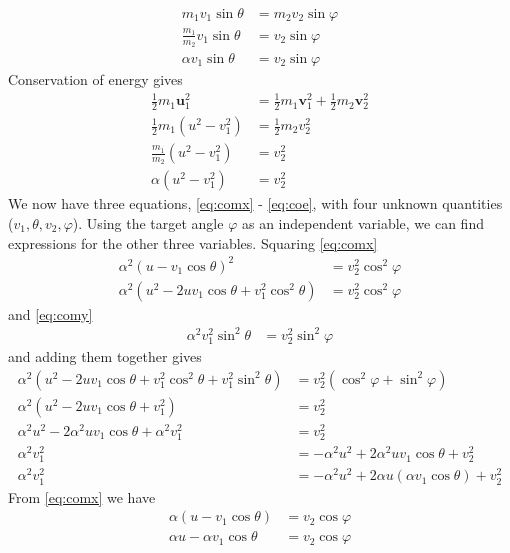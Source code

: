 \documentclass[twoside,english]{uiofysmaster/uiofysmaster}
\let\orgautoref\autoref
\renewcommand{\autoref}
        {%
		 \def\sectionautorefname{Section}%
		 \def\subsectionautorefname{Section}%
		 \def\subsubsectionautorefname{Section}%
		 \def\chapterautorefname{Chapter}%
          \orgautoref}
\begin{document}
\begin{appendices}
\begin{align}
	m_1 v_1 \sin \theta &= m_2 v_2 \sin \varphi \nonumber\\
	\frac{m_1}{m_2} v_1 \sin \theta &= v_2 \sin \varphi \nonumber\\
	\alpha v_1 \sin \theta &= v_2 \sin \varphi
\end{align}
Conservation of energy gives
\begin{align}\label{eq:coe}
	\tfrac{1}{2} m_1 \boldsymbol{u}_1^2 &= \tfrac{1}{2} m_1 \boldsymbol{v}_1^2 + \tfrac{1}{2} m_2 \boldsymbol{v}_2^2 \nonumber\\
	\tfrac{1}{2} m_1 (u^2 - v_1^2) &= \tfrac{1}{2} m_2 v_2^2 \nonumber\\
	\frac{m_1}{m_2} (u^2 - v_1^2) &= v_2^2 \nonumber\\
	\alpha (u^2 - v_1^2) &= v_2^2
\end{align}
We now have three equations, \autoref{eq:comx} - \autoref{eq:coe}, with four unknown quantities ($v_1, \theta, v_2, \varphi$). 
Using the target angle $\varphi$ as an independent variable, we can find expressions for the other three variables. 
Squaring \autoref{eq:comx} 
\begin{align*}%
	\alpha^2 (u - v_1 \cos \theta)^2 &= v_2^2 \cos^2 \varphi  \\
	\alpha^2 (u^2 - 2uv_1 \cos \theta + v_1^2 \cos^2 \theta) &= v_2^2 \cos^2 \varphi
\end{align*}
and \autoref{eq:comy}
\begin{align*}%
	\alpha^2 v_1^2 \sin^2 \theta &= v_2^2 \sin^2 \varphi
\end{align*}
and adding them together gives
\begin{align}\label{eq:av}
	\alpha^2 (u^2 - 2uv_1 \cos \theta + v_1^2 \cos^2 \theta + v_1^2 \sin^2 \theta) &= v_2^2 (\cos^2 \varphi + \sin^2 \varphi)  \nonumber\\
	\alpha^2 (u^2 - 2uv_1 \cos \theta + v_1^2) &= v_2^2  \nonumber\\
	\alpha^2 u^2 - 2\alpha^2 uv_1 \cos \theta + \alpha^2 v_1^2 &= v_2^2  \nonumber\\
	\alpha^2 v_1^2 &= -\alpha^2 u^2 + 2\alpha^2 uv_1 \cos \theta + v_2^2  \nonumber\\
	\alpha^2 v_1^2 &= -\alpha^2 u^2 + 2\alpha u (\alpha v_1 \cos \theta) + v_2^2
\end{align}
From \autoref{eq:comx} we have
\begin{align}\label{eq:comx2}
	\alpha (u - v_1 \cos \theta) &= v_2 \cos \varphi  \nonumber\\
	\alpha u - \alpha v_1 \cos \theta &= v_2 \cos \varphi  \nonumber\\

\end{align}
\end{appendices}
\end{document}
